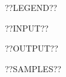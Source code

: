 \renewcommand\problemletter{??LETTER??}
\renewcommand\problemtitle{??NAME??}
\renewcommand\timelimit{??TIMELIMIT??}
\renewcommand\memorylimit{??MEMORYLIMIT??}

\problemheader
??LEGEND??

??INPUT??

\outputsection
??OUTPUT??

??SAMPLES??
